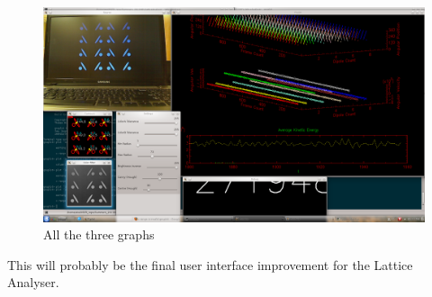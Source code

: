 			\begin{figure}[bth]
				\begin{center}
					\includegraphics[width=1.1\linewidth]{../../latticeAnalyser/snapshot11.png}
				\end{center}
			\caption[All the three graphs]{All the three graphs}
			\label{snapshot11}
			\end{figure}
			This will probably be the final user interface improvement for the Lattice Analyser.

